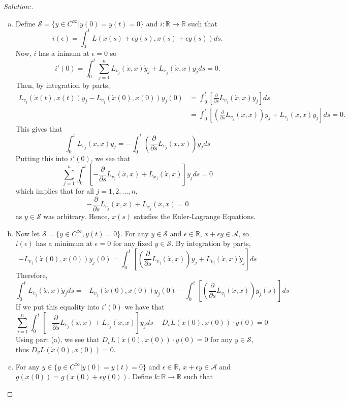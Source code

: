 \documentclass{article}
\newcommand{\R}{\mathbb{R}}
\begin{document}
    \begin{proof}[Solution:]
      \begin{enumerate}[(a)]
        \item Define $\mathcal{S} = \{y\in C^\infty|y(0)=y(t)=0\}$ and $i : \R\to\R$ such that 
        \[i(\epsilon) = \int_0^t L(\dot{x}(s) + \epsilon \dot{y}(s), x(s)+\epsilon y(s))ds.\]
        Now, $i$ has a inimum at $\epsilon = 0$ so 
        \[i'(0) = \int_0^t\sum_{j=1}^n L_{v_j}(\dot{x},x)\dot{y}_j + L_{x_j}(\dot{x},x)y_jds = 0.\]
        Then, by integration by parts, 
        \begin{align*}
          L_{v_j}(\dot{x}(t),x(t))y_j - L_{v_j}(\dot{x}(0),x(0))y_j(0) &= \int_0^t \left[\frac{\partial}{\partial s}L_{v_j}(\dot{x},x)y_j\right]ds \\
          &= \int_0^t \left[\left(\frac{\partial}{\partial s}L_{v_j}(\dot{x},x)\right)y_j + L_{v_j}(\dot{x},x)\dot{y}_j\right]ds = 0.
        \end{align*}
        This gives that 
        \[\int_0^t L_{v_j}(\dot{x},x)\dot{y}_j = - \int_0^t\left(\frac{\partial}{\partial s} L_{v_j}(\dot{x},x)\right)y_jds\]
        Putting this into $i'(0)$, we see that 
        \[\sum_{j=1}^n\int_0^t \left[-\frac{\partial}{\partial s} L_{v_j}(\dot{x},x) + L_{x_j}(\dot{x},x)\right]y_jds = 0\]
        which implies that for all $j=1,2,\dots,n$,
        \[-\frac{\partial}{\partial s}L_{v_j}(\dot{x},x) + L_{x_j}(\dot{x},x) = 0\]
        as $y\in \mathcal{S}$ was arbitrary. Hence,  $x(s)$ satisfies the Euler-Lagrange Equations.
        \item Now let $\mathcal{S} = \{y\in C^\infty, y(t)=0\}$. For any $y\in \mathcal{S}$ and $\epsilon\in\R$, $x+\epsilon y \in \mathcal{A}$, so $i(\epsilon)$ has a minimum at $\epsilon = 0$ for any fixed $y\in \mathcal{S}$. By integration by parts, 
        \[-L_{v_j}(\dot{x}(0),x(0))y_j(0) = \int_0^t\left[\left(\frac{\partial}{\partial s} L_{v_j}(\dot{x},x)\right)y_j+L_{v_j}(\dot{x},x)\dot{y}_j\right]ds \]
        Therefore, 
        \[ \int_0^t L_{v_j}(\dot{x},x)\dot{y}_jds = -L_{v_j}(\dot{x}(0),x(0))y_j(0)-\int_0^t\left[\left(\frac{\partial}{\partial s} L_{v_j}(\dot{x},x)\right)y_j(s)\right]ds\]
        If we put this equality into $i'(0)$ we have that 
        \[\sum_{j=1}^n\int_0^t \left[-\frac{\partial}{\partial s}L_{v_j}(\dot{x},x) + L_{x_j}(\dot{x},x)\right]y_jds - D_vL(\dot{x}(0),x(0))\cdot y(0) = 0\]
        Using part (a), we see that $D_vL(\dot{x}(0),x(0))\cdot y(0) = 0$ for any $y\in \mathcal{S}$, thus $D_vL(\dot{x}(0),x(0)) = 0$.
        \item For any $y \in \{y\in C^\infty|y(0)=y(t)=0\}$ and $\epsilon \in \R$, $x + \epsilon y \in \mathcal{A}$ and $g(x(0)) = g(x(0) + \epsilon y(0))$. Define $k:\R\to\R$ such that 

\end{enumerate}
\end{proof}
\end{document}
